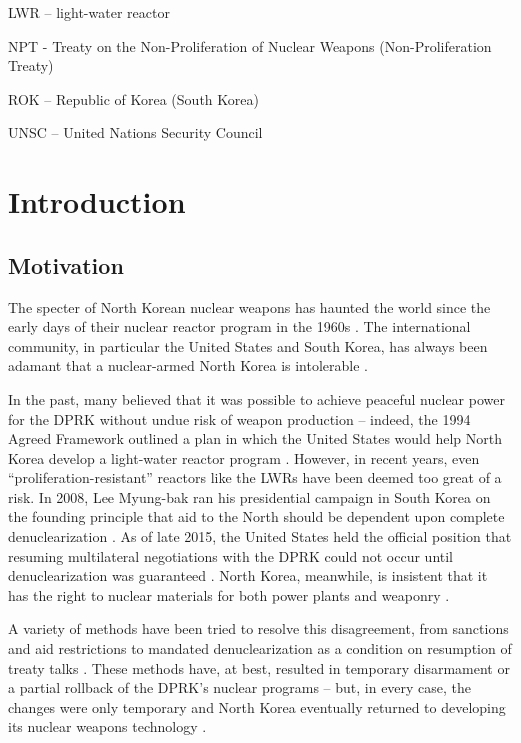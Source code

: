 \documentclass{article}
\begin{document}
\noindent LWR – light-water reactor

\noindent NPT - Treaty on the Non-Proliferation of Nuclear Weapons (Non-Proliferation Treaty)

\noindent ROK – Republic of Korea (South Korea)

\noindent UNSC – United Nations Security Council

\section{Introduction}

\subsection{Motivation}

The specter of North Korean nuclear weapons has haunted the world since the early days of their nuclear reactor program in the 1960s \cite{pincus}. The international community, in particular the United States and South Korea, has always been adamant that a nuclear-armed North Korea is intolerable \cite{kerry,parksk}.

In the past, many believed that it was possible to achieve peaceful nuclear power for the DPRK without undue risk of weapon production – indeed, the 1994 Agreed Framework outlined a plan in which the United States would help North Korea develop a light-water reactor program \cite{agreed}. However, in recent years, even “proliferation-resistant” reactors like the LWRs have been deemed too great of a risk. In 2008, Lee Myung-bak ran his presidential campaign in South Korea on the founding principle that aid to the North should be dependent upon complete denuclearization \cite{snyder}. As of late 2015, the United States held the official position that resuming multilateral negotiations with the DPRK could not occur until denuclearization was guaranteed \cite{pennington}. North Korea, meanwhile, is insistent that it has the right to nuclear materials for both power plants and weaponry \cite{kcna}. 

A variety of methods have been tried to resolve this disagreement, from sanctions and aid restrictions to mandated denuclearization as a condition on resumption of treaty talks \cite{bajoria,davenport}. These methods have, at best, resulted in temporary disarmament or a partial rollback of the DPRK’s nuclear programs – but, in every case, the changes were only temporary and North Korea eventually returned to developing its nuclear weapons technology \cite{davenport,nti15,iaea09}.
\end{document}
